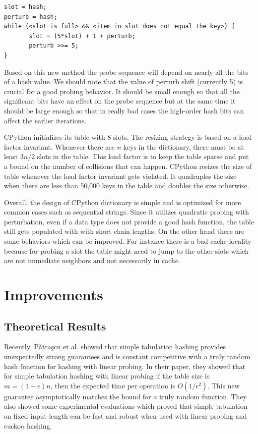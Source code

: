 \documentclass[11pt]{article}
\begin{document}
\begin{verbatim}
slot = hash;
perturb = hash;
while (<slot is full> && <item in slot does not equal the key>) {
       slot = (5*slot) + 1 + perturb;
       perturb >>= 5;
}
\end{verbatim}

Based on this new method the probe sequence will depend on nearly all the bits
of a hash value. We should note that the value of  perturb shift (currently 5)
is crucial for a good probing behavior.  It should be small enough so that
all the significant bits have an effect on the probe sequence but at the same
time it should be large enough so that in really bad cases the high-order hash
bits can affect the earlier iterations.

CPython initializes its table with 8 slots. The resizing strategy is based on a
load factor invariant. Whenever there are $n$ keys in the dictionary, there must
be at least $3n/2$ slots in the table. This load factor is to keep the table
sparse and put a bound on the number of collisions that can happen. CPython
resizes the size of table whenever the load factor invariant gets violated. It
quadruples the size when there are less than 50,000 keys in the table and
doubles the size otherwise. 

Overall, the design of CPython dictionary is simple and is optimized for more
common cases such as sequential strings. Since it utilizes quadratic probing
with perturbation, even if a data type does not provide a good hash function,
the table still gets populated with with short chain lengths.  On the other hand
there are some behaviors which can be improved. For instance there is a bad
cache locality because for probing a slot the table might need to jump to the
other slots which are not immediate neighbors and not necessarily in cache. 

\section{Improvements}

\subsection{Theoretical Results}
Recently, P\v{a}tra\c{s}cu et al. \cite{mihai} showed that simple tabulation hashing provides unexpectedly strong guarantees and is constant competitive with a truly random hash function for hashing with linear probing. In their paper, they showed that for simple tabulation hashing with linear probing if the table size is $m = (1 + \epsilon)n$, then the expected time per operation is $O(1/\epsilon^2)$. This new guarantee asymptotically matches the
bound for a truly random function. They also showed some experimental evaluations which proved that simple tabulation on fixed input length can be fast and robust when used with linear probing and cuckoo hashing. 
\end{document}
